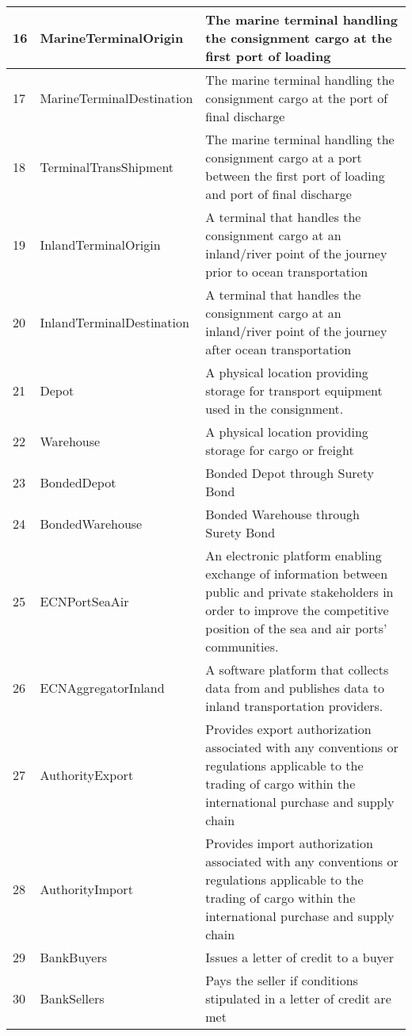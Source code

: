 \begin{table}
\begin{tabular}{|l|l|l|}
        16 & MarineTerminalOrigin & The marine terminal handling the consignment cargo at the first port of loading \\ \hline
        17 & MarineTerminalDestination & The marine terminal handling the consignment cargo at the port of final discharge \\ \hline
        18 & TerminalTransShipment & The marine terminal handling the consignment cargo at a port between the first port of loading and port of final discharge \\ \hline
        19 & InlandTerminalOrigin & A terminal that handles the consignment cargo at an inland/river point of the journey prior to ocean transportation \\ \hline
        20 & InlandTerminalDestination & A terminal that handles the consignment cargo at an inland/river point of the journey after ocean transportation \\ \hline
        21 & Depot & A physical location providing storage for transport equipment used in the consignment. \\ \hline
        22 & Warehouse & A physical location providing storage for cargo or freight \\ \hline
        23 & BondedDepot & Bonded Depot through Surety Bond \\ \hline
        24 & BondedWarehouse & Bonded Warehouse through Surety Bond \\ \hline
        25 & ECNPortSeaAir & An electronic platform enabling exchange of information between public and private stakeholders in order to improve the competitive position of the sea and air ports’ communities. \\ \hline
        26 & ECNAggregatorInland & A software platform that collects data from and publishes data to inland transportation providers. \\ \hline
        27 & AuthorityExport & Provides export authorization associated with any conventions or regulations applicable to the trading of cargo within the international purchase and supply chain \\ \hline
        28 & AuthorityImport & Provides import authorization associated with any conventions or regulations applicable to the trading of cargo within the international purchase and supply chain \\ \hline
        29 & BankBuyers & Issues a letter of credit to a buyer \\ \hline
        30 & BankSellers & Pays the seller if conditions stipulated in a letter of credit are met \\ \hline

\end{tabular}
\end{table}

